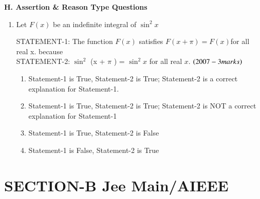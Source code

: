 \documentclass[journal,12pt,twocolumn]{IEEEtran}
\theoremstyle{remark}
\begin{document}
\textbf{ H. Assertion \& Reason Type Questions}\\
 
\begin{enumerate}
\item   Let $F(x)$ be an indefinite integral of $\sin^2 x$

STATEMENT-1: The function $F(x)$ satisfies $F(x+\pi)=F(x)$for all real x. because\\
STATEMENT-2: $\sin^2$ (x + $\pi$ ) = $\sin^2 x$ for all real $x$.   \hfill$     {\left(2007 - 3 marks\right)}$
  
    \begin{enumerate}
    
 \item Statement-1 is True, Statement-2 is True; Statement-2 is a correct explanation for Statement-1.
\item Statement-1 is True, Statement-2 is True; Statement-2 is NOT a correct explanation for Statement-1
 \item Statement-1 is True, Statement-2 is False
\item Statement-1 is False, Statement-2 is True
\end{enumerate}
\end{enumerate} 

\large\large\section{\textbf{{SECTION-B Jee Main/AIEEE}}}\small\small
\end{document}
